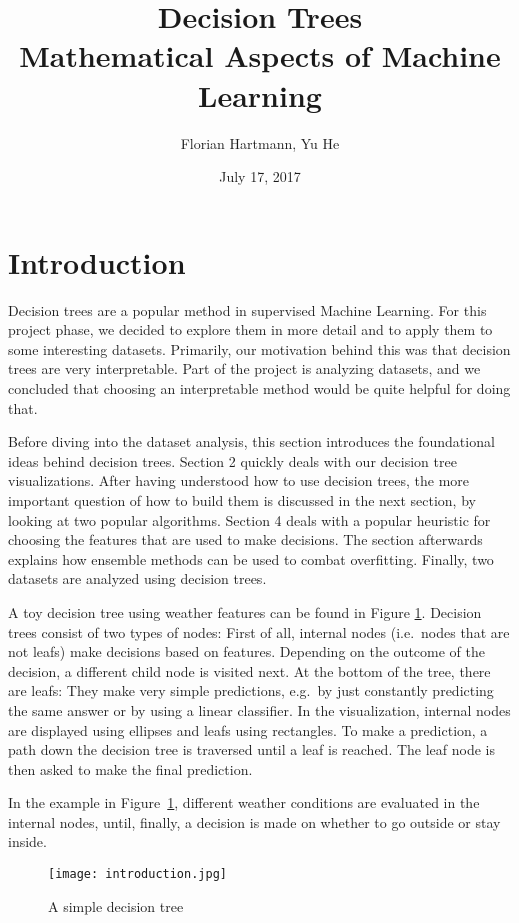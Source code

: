 \documentclass[a4paper]{article}
\title{Decision Trees\\\large{Mathematical Aspects of Machine Learning}}
\author{Florian Hartmann, Yu He}
\date{July 17, 2017}
\begin{document}
\maketitle

\section{Introduction}

Decision trees are a popular method in supervised Machine Learning. For this project phase, we decided to explore them in more detail and to apply them to some interesting datasets. Primarily, our motivation behind this was that decision trees are very interpretable. Part of the project is analyzing datasets, and we concluded that choosing an interpretable method would be quite helpful for doing that.

Before diving into the dataset analysis, this section introduces the foundational ideas behind decision trees. Section 2 quickly deals with our decision tree visualizations. After having understood how to use decision trees, the more important question of how to build them is discussed in the next section, by looking at two popular algorithms. Section 4 deals with a popular heuristic for choosing the features that are used to make decisions.
The section afterwards explains how ensemble methods can be used to combat overfitting. Finally, two datasets are analyzed using decision trees.

A toy decision tree using weather features can be found in Figure \ref{fig:simple}. Decision trees consist of two types of nodes: First of all, internal nodes (i.e.\ nodes that are not leafs) make decisions based on features. Depending on the outcome of the decision, a different child node is visited next. At the bottom of the tree, there are leafs: They make very simple predictions, e.g.\ by just constantly predicting the same answer or by using a linear classifier. In the visualization, internal nodes are displayed using ellipses and leafs using rectangles. To make a prediction, a path down the decision tree is traversed until a leaf is reached. The leaf node is then asked to make the final prediction.

In the example in Figure~\ref{fig:simple}, different weather conditions are evaluated in the internal nodes, until, finally, a decision is made on whether to go outside or stay inside.

\begin{figure}
	\centering
	\texttt{[image: introduction.jpg]}
    \caption{A simple decision tree}
    \label{fig:simple}
\end{figure}
\end{document}
